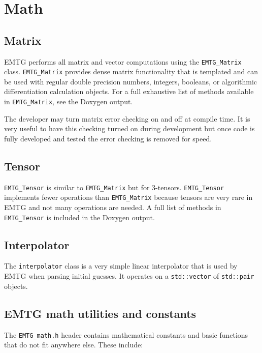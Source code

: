 \chapter{Math}
\label{chap:math}

\section{Matrix}
\label{sec:EMTG_Matrix}

\ac{EMTG} performs all matrix and vector computations using the \texttt{EMTG\_Matrix} class. \texttt{EMTG\_Matrix} provides dense matrix functionality that is templated and can be used with regular double precision numbers, integers, booleans, or algorithmic differentiation calculation objects. For a full exhaustive list of methods available in \texttt{EMTG\_Matrix}, see the Doxygen output.

The developer may turn matrix error checking on and off at compile time. It is very useful to have this checking turned on during development but once code is fully developed and tested the error checking is removed for speed.

\section{Tensor}
\label{sec:EMTG_Tensor}

\texttt{EMTG\_Tensor} is similar to \texttt{EMTG\_Matrix} but for 3-tensors. \texttt{EMTG\_Tensor} implements fewer operations than \texttt{EMTG\_Matrix} because tensors are very rare in \ac{EMTG} and not many operations are needed. A full list of methods in \texttt{EMTG\_Tensor} is included in the Doxygen output.

\section{Interpolator}
\label{sec:EMTG_interpolator}

The \texttt{interpolator} class is a very simple linear interpolator that is used by \ac{EMTG} when parsing initial guesses. It operates on a \texttt{std::vector} of \texttt{std::pair} objects.

\section{EMTG math utilities and constants}
\label{sec:EMTG_math}

The \texttt{EMTG\_math.h} header contains mathematical constants and basic functions that do not fit anywhere else. These include:


